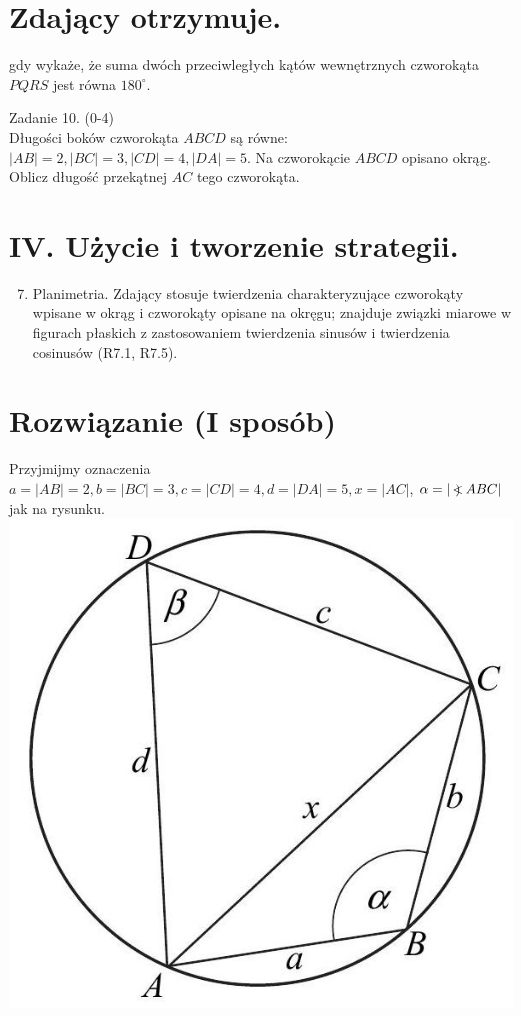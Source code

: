 \documentclass[10pt]{article}
\newcommand\Varangle{\mathop{{<\!\!\!\!\!\text{\small)}}\:}\nolimits}
\begin{document}
\section*{Zdający otrzymuje.}
gdy wykaże, że suma dwóch przeciwległych kątów wewnętrznych czworokąta $P Q R S$ jest równa $180^{\circ}$.

Zadanie 10. (0-4)\\
Długości boków czworokąta $A B C D$ są równe: $|A B|=2,|B C|=3,|C D|=4,|D A|=5$. Na czworokącie $A B C D$ opisano okrąg. Oblicz długość przekątnej $A C$ tego czworokąta.

\section*{IV. Użycie i tworzenie strategii.}
\begin{enumerate}
  \setcounter{enumi}{6}
  \item Planimetria. Zdający stosuje twierdzenia charakteryzujące czworokąty wpisane w okrąg i czworokąty opisane na okręgu; znajduje związki miarowe w figurach płaskich z zastosowaniem twierdzenia sinusów i twierdzenia cosinusów (R7.1, R7.5).
\end{enumerate}

\section*{Rozwiązanie (I sposób)}
Przyjmijmy oznaczenia $a=|A B|=2, b=|B C|=3, c=|C D|=4, d=|D A|=5, x=|A C|$, $\alpha=|\Varangle A B C|$ jak na rysunku.\\
\includegraphics[max width=\textwidth, center]{2025_02_07_f5f4e8f37e6baab02e47g-11}
\end{document}
